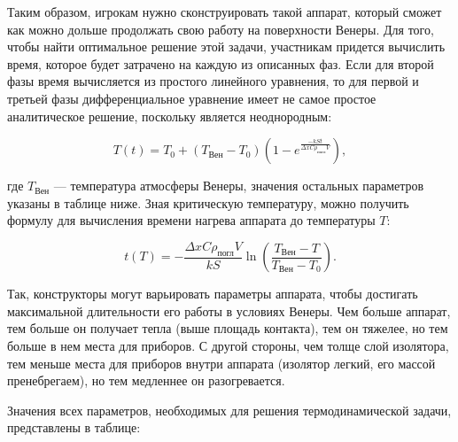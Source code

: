 \documentclass[12pt,a4paper]{article}
\begin{document}
Таким образом, игрокам нужно сконструировать такой аппарат, который сможет как можно
дольше продолжать свою работу на поверхности Венеры. Для того, чтобы найти оптимальное
решение этой задачи, участникам придется вычислить время, которое будет затрачено на
каждую из описанных фаз. Если для второй фазы время вычисляется из простого линейного
уравнения, то для первой и третьей фазы дифференциальное уравнение имеет не самое простое
аналитическое решение, поскольку является неоднородным:

$$
T(t) = T_0 + (T_{\text{Вен}} - T_0)\left(1 - e^{\frac{-k S t}{\Delta x C \rho_{\text{погл}} V}}\right),
$$

где $T_{\text{Вен}}$ — температура атмосферы Венеры, значения остальных параметров указаны в таблице
ниже. Зная критическую температуру, можно получить формулу для вычисления времени нагрева
аппарата до температуры $T$:

$$
t(T) = - \frac{\Delta x C \rho_{\text{погл}} V}{k S} \ln{\left(\frac{T_{\text{Вен}} -
    T}{T_{\text{Вен}} - T_0}\right)}.
$$

Так, конструкторы могут варьировать параметры аппарата, чтобы достигать максимальной
длительности его работы в условиях Венеры. Чем больше аппарат, тем больше он получает
тепла (выше площадь контакта), тем он тяжелее, но тем больше в нем места для приборов. С
другой стороны, чем толще слой изолятора, тем меньше места для приборов внутри аппарата
(изолятор легкий, его массой пренебрегаем), но тем медленнее он разогревается.

Значения всех параметров, необходимых для решения термодинамической задачи, представлены в таблице:
\end{document}
